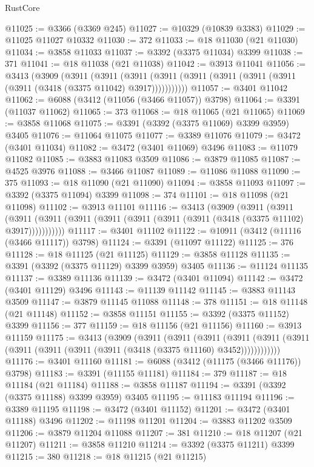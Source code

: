 \begin{lexlean}{RustCore}
\begin{coremodule}
@11025 := @3366 (@3369 @245)
@11027 := @10329 (@10839 @3383)
@11029 := @11025 @11027 @10332
@11030 := 372
@11033 := @18 @11030 (@21 @11030)
@11034 := @3858 @11033
@11037 := @3392 (@3375 @11034) @3399
@11038 := 371
@11041 := @18 @11038 (@21 @11038)
@11042 := @3913 @11041
@11056 := @3413
    (@3909
      (@3911
        (@3911
          (@3911 (@3911 (@3911 (@3911 (@3911 (@3911 (@3911 (@3418 (@3375 @11042) @3917)))))))))))
@11057 := @3401 @11042
@11062 := @6088 (@3412 (@11056 (@3466 @11057)) @3798)
@11064 := @3391 (@11037 @11062)
@11065 := 373
@11068 := @18 @11065 (@21 @11065)
@11069 := @3858 @11068
@11075 := @3391 (@3392 (@3375 @11069) @3399 @3959) @3405
@11076 := @11064 @11075
@11077 := @3389 @11076
@11079 := @3472 (@3401 @11034)
@11082 := @3472 (@3401 @11069) @3496
@11083 := @11079 @11082
@11085 := @3883 @11083 @3509
@11086 := @3879 @11085
@11087 := @4525 @3976
@11088 := @3466 @11087
@11089 := @11086 @11088
@11090 := 375
@11093 := @18 @11090 (@21 @11090)
@11094 := @3858 @11093
@11097 := @3392 (@3375 @11094) @3399
@11098 := 374
@11101 := @18 @11098 (@21 @11098)
@11102 := @3913 @11101
@11116 := @3413
    (@3909
      (@3911
        (@3911
          (@3911 (@3911 (@3911 (@3911 (@3911 (@3911 (@3911 (@3418 (@3375 @11102) @3917)))))))))))
@11117 := @3401 @11102
@11122 := @10911 (@3412 (@11116 (@3466 @11117)) @3798)
@11124 := @3391 (@11097 @11122)
@11125 := 376
@11128 := @18 @11125 (@21 @11125)
@11129 := @3858 @11128
@11135 := @3391 (@3392 (@3375 @11129) @3399 @3959) @3405
@11136 := @11124 @11135
@11137 := @3389 @11136
@11139 := @3472 (@3401 @11094)
@11142 := @3472 (@3401 @11129) @3496
@11143 := @11139 @11142
@11145 := @3883 @11143 @3509
@11147 := @3879 @11145 @11088
@11148 := 378
@11151 := @18 @11148 (@21 @11148)
@11152 := @3858 @11151
@11155 := @3392 (@3375 @11152) @3399
@11156 := 377
@11159 := @18 @11156 (@21 @11156)
@11160 := @3913 @11159
@11175 := @3413
    (@3909
      (@3911
        (@3911
          (@3911
            (@3911 (@3911 (@3911 (@3911 (@3911 (@3911 (@3911 (@3418 (@3375 @11160) @3452))))))))))))
@11176 := @3401 @11160
@11181 := @6088 (@3412 (@11175 (@3466 @11176)) @3798)
@11183 := @3391 (@11155 @11181)
@11184 := 379
@11187 := @18 @11184 (@21 @11184)
@11188 := @3858 @11187
@11194 := @3391 (@3392 (@3375 @11188) @3399 @3959) @3405
@11195 := @11183 @11194
@11196 := @3389 @11195
@11198 := @3472 (@3401 @11152)
@11201 := @3472 (@3401 @11188) @3496
@11202 := @11198 @11201
@11204 := @3883 @11202 @3509
@11206 := @3879 @11204 @11088
@11207 := 381
@11210 := @18 @11207 (@21 @11207)
@11211 := @3858 @11210
@11214 := @3392 (@3375 @11211) @3399
@11215 := 380
@11218 := @18 @11215 (@21 @11215)

\end{coremodule}
\end{lexlean}
